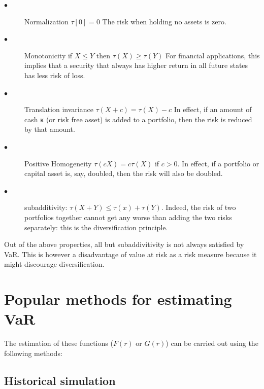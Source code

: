 \documentclass[a4paper,11pt,oneside]{book}
\begin{document}
\begin{description}
	\item[$\bullet$] Normalization \newline $\tau[0] = 0$ \newline The risk when holding no assets is zero.
	\item[$\bullet$] Monotonicity \newline if $X \leq Y$ then $\tau(X) \geq \tau(Y)$ \newline For financial applications, this implies that a
	security that always has higher return in all future states has less risk of loss.
	
	\item[$\bullet$] Translation invariance
	\newline  $\tau(X+c) = \tau(X)-c$ \newline In effect, if an amount of cash κ (or risk free asset)
	is added to a portfolio, then the risk is reduced by that amount.
	\item[$\bullet$] Positive Homogeneity
	\newline $\tau(cX) = c\tau(X)$ if $c>0$. \newline In effect, if a portfolio or capital asset is, say,
	doubled, then the risk will also be doubled.
	
		\item[$\bullet$] subadditivity: 
	\newline $\tau(X+Y)\leq \tau(x)+\tau(Y)$. 
	Indeed, the risk of two portfolios together cannot get any worse than adding the two risks separately: this is the diversification principle.
	
\end{description}
Out of the above properties, all but subaddivitivity is not always satisfied by VaR. This is however a disadvantage of value at risk as a risk measure because it might discourage diversification.

\section{Popular methods for estimating VaR}
The estimation of these functions ($F(r)$ or $G(r)$) can be carried out using the
following methods:

\subsection{Historical simulation}
\end{document}
